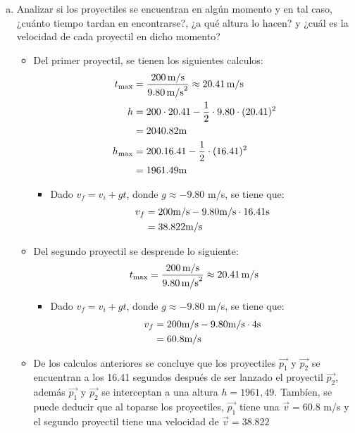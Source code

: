 \documentclass[12pt,tikz,border=3.14mm]{article}
\begin{document}
\begin{enumerate}[a),leftmargin=1cm]
\begin{itemize}
				\end{itemize}
			\item Analizar si los proyectiles se encuentran en algún momento y en tal caso, ¿cuánto tiempo tardan en encontrarse?, ¿a qué altura lo hacen? y ¿cuál es la velocidad de cada proyectil en dicho momento?
				\begin{itemize}
					\item Del primer proyectil, se tienen los siguientes calculos: 
						\begin{align*}
							t_{\rm{max}} & = \frac{200 \, \rm{ m/s}}{9.80 \, \rm{m/s}^{2}} \approx 20.41 \, \rm{m/s} \\
							h&= 200 \cdot 20.41 - \frac{1}{2} \cdot 9.80 \cdot (20.41)^{2} \\
							& = 2040.82 \rm{m} \\
							h_{\rm{max}} &= 200.16.41- \frac{1}{2} \cdot (16.41)^{2} \\ 
							& = 1961.49 \rm{m}
						\end{align*}	
							\begin{itemize}
								\item Dado $v_f = v_i + gt$, donde $g \approx -9.80$ m/s, se tiene que:
									\begin{align*}
										v_f & = 200 \rm{m/s} - 9.80 \rm{m/s} \cdot 16.41 \rm{s} \\
											& = 38.822 \rm{m/s}
									\end{align*}
							\end{itemize}
	\newpage											
			\item Del segundo proyectil se desprende lo siguiente: 
				\begin{align*}
					t_{\rm{max}} = \frac{200 \, \rm{ m/s}}{9.80 \, \rm{m/s}^{2}} \approx 20.41 \, \rm{m/s}
				\end{align*}
					\begin{itemize}
						\item Dado $v_f = v_i + gt$, donde $g \approx -9.80$ m/s, se tiene que:
							\begin{align*}
								v_f & = 200 \rm{m/s} - 9.80 \rm{m/s} \cdot 4 \rm{s} \\
									& = 60.8 \rm{m/s}
							\end{align*}
					\end{itemize}
			\item De los calculos anteriores se concluye que los proyectiles $\vec{p_1}$ y $\vec{p_2}$ se encuentran a los 16.41 segundos después de ser lanzado el proyectil $\vec{p_2}$, además $\vec{p_1}$ y $\vec{p_2}$ se interceptan a una altura $h = 1961,49$. Tambíen, se puede deducir que al toparse los proyectiles, $\vec{p_1}$ tiene una $\vec{v} = 60.8$ m/s y el segundo proyectil tiene una velocidad de $\vec{v} = 38.822$
			\end{itemize}
				

\end{enumerate}
\end{document}
